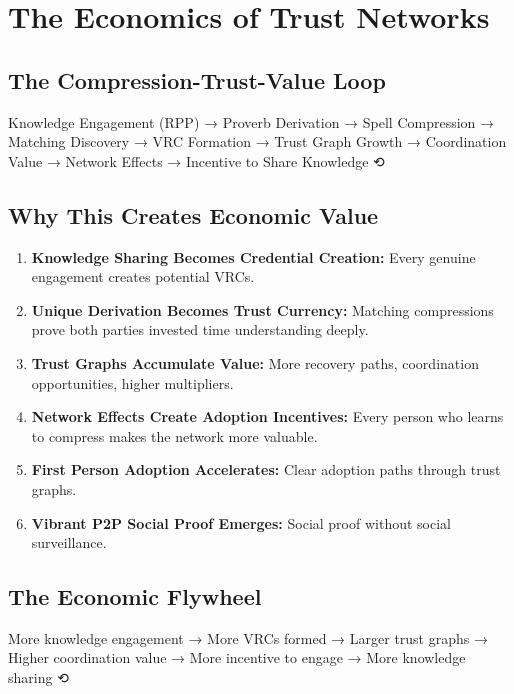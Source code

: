 \documentclass[
]{article}
\begin{document}
\section{The Economics of Trust
Networks}\label{the-economics-of-trust-networks}

\subsection{The Compression-Trust-Value
Loop}\label{the-compression-trust-value-loop}

Knowledge Engagement (RPP) → Proverb Derivation → Spell Compression →
Matching Discovery → VRC Formation → Trust Graph Growth → Coordination
Value → Network Effects → Incentive to Share Knowledge ⟲

\subsection{Why This Creates Economic
Value}\label{why-this-creates-economic-value}

\begin{enumerate}
\def\labelenumi{\arabic{enumi}.}
\item
  \textbf{Knowledge Sharing Becomes Credential Creation:} Every genuine
  engagement creates potential VRCs.
\item
  \textbf{Unique Derivation Becomes Trust Currency:} Matching
  compressions prove both parties invested time understanding deeply.
\item
  \textbf{Trust Graphs Accumulate Value:} More recovery paths,
  coordination opportunities, higher multipliers.
\item
  \textbf{Network Effects Create Adoption Incentives:} Every person who
  learns to compress makes the network more valuable.
\item
  \textbf{First Person Adoption Accelerates:} Clear adoption paths
  through trust graphs.
\item
  \textbf{Vibrant P2P Social Proof Emerges:} Social proof without social
  surveillance.
\end{enumerate}

\subsection{The Economic Flywheel}\label{the-economic-flywheel}

More knowledge engagement → More VRCs formed → Larger trust graphs →
Higher coordination value → More incentive to engage → More knowledge
sharing ⟲
\end{document}
